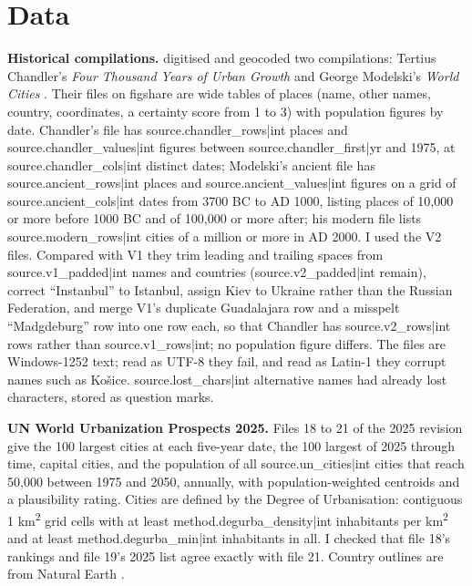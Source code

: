 \documentclass[11pt,a4paper]{article}
\begin{document}
\section{Data}
\textbf{Historical compilations.} \citet{reba} digitised and geocoded two compilations: Tertius Chandler's \textit{Four Thousand Years of Urban Growth} \citep{chandler} and George Modelski's \textit{World Cities} \citep{modelski}. Their files on figshare \citep{figc,figa,figm} are wide tables of places (name, other names, country, coordinates, a certainty score from 1 to 3) with population figures by date. Chandler's file has {{source.chandler_rows|int}} places and {{source.chandler_values|int}} figures between {{source.chandler_first|yr}} and 1975, at {{source.chandler_cols|int}} distinct dates; Modelski's ancient file has {{source.ancient_rows|int}} places and {{source.ancient_values|int}} figures on a grid of {{source.ancient_cols|int}} dates from 3700 BC to AD 1000, listing places of 10,000 or more before 1000 BC and of 100,000 or more after; his modern file lists {{source.modern_rows|int}} cities of a million or more in AD 2000. I used the V2 files. Compared with V1 they trim leading and trailing spaces from {{source.v1_padded|int}} names and countries ({{source.v2_padded|int}} remain), correct ``Instanbul'' to Istanbul, assign Kiev to Ukraine rather than the Russian Federation, and merge V1's duplicate Guadalajara row and a misspelt ``Madgdeburg'' row into one row each, so that Chandler has {{source.v2_rows|int}} rows rather than {{source.v1_rows|int}}; no population figure differs. The files are Windows-1252 text; read as UTF-8 they fail, and read as Latin-1 they corrupt names such as Košice. {{source.lost_chars|int}} alternative names had already lost characters, stored as question marks.

\textbf{UN World Urbanization Prospects 2025.} Files 18 to 21 of the 2025 revision \citep{wup} give the 100 largest cities at each five-year date, the 100 largest of 2025 through time, capital cities, and the population of all {{source.un_cities|int}} cities that reach 50,000 between 1975 and 2050, annually, with population-weighted centroids and a plausibility rating. Cities are defined by the Degree of Urbanisation: contiguous 1 km\textsuperscript{2} grid cells with at least {{method.degurba_density|int}} inhabitants per km\textsuperscript{2} and at least {{method.degurba_min|int}} inhabitants in all. I checked that file 18's rankings and file 19's 2025 list agree exactly with file 21. Country outlines are from Natural Earth \citep{ne}.
\end{document}
